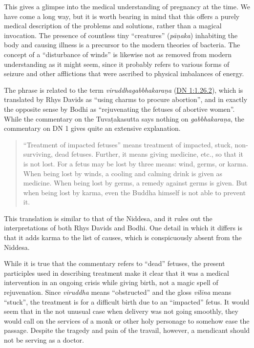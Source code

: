 \documentclass[12pt,openany]{book}%
\begin{document}
This gives a glimpse into the medical understanding of pregnancy at the time. We have come a long way, but it is worth bearing in mind that this offers a purely medical description of the problems and solutions, rather than a magical invocation. The presence of countless tiny “creatures” (\textit{\textsanskrit{pāṇaka}}) inhabiting the body and causing illness is a precursor to the modern theories of bacteria. The concept of a “disturbance of winds” is likewise not as removed from modern understanding as it might seem, since it probably refers to various forms of seizure and other afflictions that were ascribed to physical imbalances of energy.

The phrase is related to the term \textit{\textsanskrit{viruddhagabbhakaraṇa}} (\href{https://suttacentral.net/dn1/en/sujato\#1.26.2}{DN 1:1.26.2}), which is translated by Rhys Davids as “using charms to procure abortion”, and in exactly the opposite sense by Bodhi as “rejuvenating the fetuses of abortive women”. While the commentary on the \textsanskrit{Tuvaṭakasutta} says nothing on \textit{\textsanskrit{gabbhakaraṇa}}, the commentary on DN 1 gives quite an extensive explanation.

\begin{quotation}%
“Treatment of impacted fetuses” means treatment of impacted, stuck, non-surviving, dead fetuses. Further, it means giving medicine, etc., so that it is not lost. For a fetus may be lost by three means: wind, germs, or karma. When being lost by winds, a cooling and calming drink is given as medicine. When being lost by germs, a remedy against germs is given. But when being lost by karma, even the Buddha himself is not able to prevent it.

%
\end{quotation}

This translation is similar to that of the Niddesa, and it rules out the interpretations of both Rhys Davids and Bodhi. One detail in which it differs is that it adds karma to the list of causes, which is conspicuously absent from the Niddesa.

While it is true that the commentary refers to “dead” fetuses, the present participles used in describing treatment make it clear that it was a medical intervention in an ongoing crisis while giving birth, not a magic spell of rejuvenation. Since \textit{viruddha} means “obstructed” and the gloss \textit{\textsanskrit{vilīna}} means “stuck”, the treatment is for a difficult birth due to an “impacted” fetus. It would seem that in the not unusual case when delivery was not going smoothly, they would call on the services of a monk or other holy personage to somehow ease the passage. Despite the tragedy and pain of the travail, however, a mendicant should not be serving as a doctor.
\end{document}
